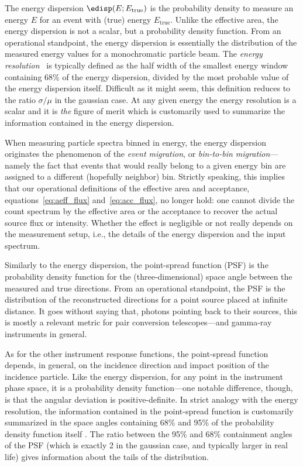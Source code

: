 The energy dispersion $\edisp(E; E_\text{true})$ is the probability density to
measure an energy $E$ for an event with (true) energy $E_\text{true}$. Unlike the
effective area, the energy dispersion is not a scalar, but a probability density
function. From an operational standpoint, the energy dispersion is essentially the
distribution of the measured energy values for a monochromatic particle beam.
The \emph{energy resolution} \eresl\ is typically defined as the half width of the
smallest energy window containing 68\% of the energy dispersion, divided by the
most probable value of the energy dispersion itself. Difficult as it might seem,
this definition reduces to the ratio $\sigma/\mu$ in the gaussian case.
At any given energy the energy resolution is a scalar and it is \emph{the}
figure of merit which is customarily used to summarize the information
contained in the energy dispersion.

When measuring particle spectra binned in energy, the energy dispersion
originates the phenomenon of the \emph{event migration}, or
\emph{bin-to-bin migration}---namely the fact that events that would really
belong to a given energy bin are assigned to a different (hopefully neighbor)
bin. Strictly speaking, this implies that our operational definitions of
the effective area and acceptance, equations~\eqref{eq:aeff_flux}
and~\eqref{eq:acc_flux}, no longer hold: one cannot divide the count spectrum
by the effective area or the acceptance to recover the actual source flux
or intensity. Whether the effect is negligible or not really depends on the
measurement setup, i.e., the details of the energy dispersion and the
input spectrum.

Similarly to the energy dispersion, the point-spread function (PSF) is the
probability density function for the (three-dimensional) space angle between
the measured and true directions. From an operational standpoint, the PSF
is the distribution of the reconstructed directions for a point source placed
at infinite distance. It goes without saying that, photons pointing back to
their sources, this is mostly a relevant metric for pair conversion
telescopes---and gamma-ray instruments in general.

As for the other instrument response functions, the point-spread function
depends, in general, on the incidence direction and impact position of the
incidence particle. Like the energy dispersion, for any point in the
instrument phase space, it is a probability density function---one notable
difference, though, is that the angular deviation is positive-definite.
In strict analogy with the energy resolution, the information contained in the
point-spread function is customarily summarized in the space angles containing
68\% and 95\% of the probability density function itself%
.
The ratio between the 95\% and 68\% containment angles of the PSF (which is
exactly 2 in the gaussian case, and typically larger in real life) gives
information about the tails of the distribution.


